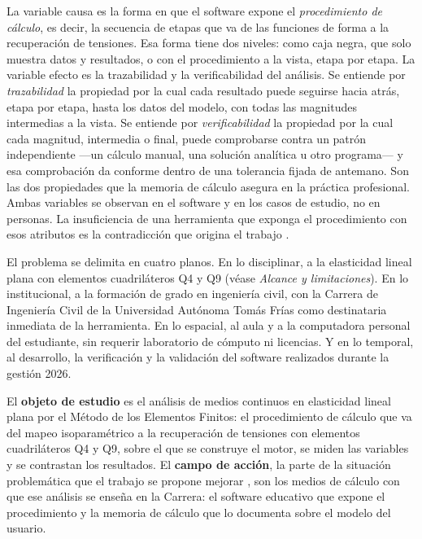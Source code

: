 La variable causa es la forma en que el software expone el \emph{procedimiento de cálculo}, es decir, la secuencia de etapas que va de las funciones de forma a la recuperación de tensiones. Esa forma tiene dos niveles: como caja negra, que solo muestra datos y resultados, o con el procedimiento a la vista, etapa por etapa. La variable efecto es la trazabilidad y la verificabilidad del análisis. Se entiende por \emph{trazabilidad} la propiedad por la cual cada resultado puede seguirse hacia atrás, etapa por etapa, hasta los datos del modelo, con todas las magnitudes intermedias a la vista. Se entiende por \emph{verificabilidad} la propiedad por la cual cada magnitud, intermedia o final, puede comprobarse contra un patrón independiente —un cálculo manual, una solución analítica u otro programa— y esa comprobación da conforme dentro de una tolerancia fijada de antemano. Son las dos propiedades que la memoria de cálculo asegura en la práctica profesional. Ambas variables se observan en el software y en los casos de estudio, no en personas. La insuficiencia de una herramienta que exponga el procedimiento con esos atributos es la contradicción que origina el trabajo \autocite[p.~7]{alvarez_metodologia}.

El problema se delimita en cuatro planos. En lo disciplinar, a la elasticidad lineal plana con elementos cuadriláteros Q4 y Q9 (véase \emph{Alcance y limitaciones}). En lo institucional, a la formación de grado en ingeniería civil, con la Carrera de Ingeniería Civil de la Universidad Autónoma Tomás Frías como destinataria inmediata de la herramienta. En lo espacial, al aula y a la computadora personal del estudiante, sin requerir laboratorio de cómputo ni licencias. Y en lo temporal, al desarrollo, la verificación y la validación del software realizados durante la gestión 2026.

El \textbf{objeto de estudio} \autocite[p.~8]{alvarez_metodologia} es el análisis de medios continuos en elasticidad lineal plana por el Método de los Elementos Finitos: el procedimiento de cálculo que va del mapeo isoparamétrico a la recuperación de tensiones con elementos cuadriláteros Q4 y Q9, sobre el que se construye el motor, se miden las variables y se contrastan los resultados. El \textbf{campo de acción}, la parte de la situación problemática que el trabajo se propone mejorar \autocite[p.~13]{alvarez_metodologia}, son los medios de cálculo con que ese análisis se enseña en la Carrera: el software educativo que expone el procedimiento y la memoria de cálculo que lo documenta sobre el modelo del usuario.

